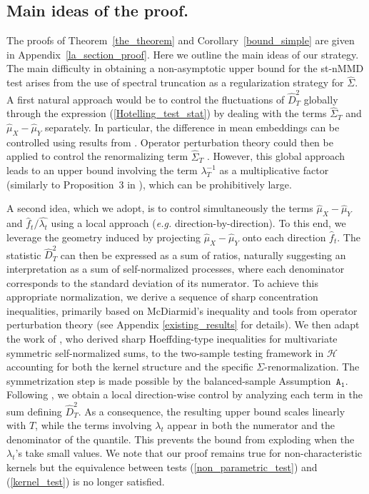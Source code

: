 \documentclass[twoside,11pt]{article}
\newcommand{\Hk}{\mathcal{H}}
\newcommand{\A}[1]{$\mathtt{A_#1}$}
\begin{document}
\subsection{Main ideas of the proof.}
The proofs of Theorem~\ref{the_theorem} and Corollary~\ref{bound_simple} are given in Appendix~\ref{la_section_proof}. Here we outline the main ideas of our strategy. The main difficulty in obtaining a non-asymptotic upper bound for the st-nMMD test arises from the use of spectral truncation as a regularization strategy for $\widehat{\Sigma}$. A first natural approach would be to control the fluctuations of $\widehat{D}^2_T$ globally through the expression (\ref{Hotelling_test_stat}) by dealing with the terms $\widehat{\Sigma}_T$ and $\widehat{\mu}_X-\widehat{\mu}_Y$ separately. 
In particular, the difference in mean embeddings can be controlled using results from \cite{gretton2012kernel}. Operator perturbation theory could then be applied to control the renormalizing term $\widehat{\Sigma}_T$ \citep{koltchinskii2000random,blanchard2007statistical,zwald2005convergence}. However, this global approach leads to an upper bound involving the term $\lambda_T^{-1}$ as a multiplicative factor (similarly to Proposition~3 in \cite{ozier2024extending}), which can be prohibitively large.

A second idea, which we adopt, is to control simultaneously the terms $\widehat{\mu}_X-\widehat{\mu}_Y$ and $\widehat{f}_t / \widehat{\lambda_t}$ using a local approach (\textit{e.g.} direction-by-direction). To this end, we  leverage the geometry induced by projecting $\widehat{\mu}_X - \widehat{\mu}_Y$ onto each direction $\widehat{f}_t$. 
The statistic $\widehat{D}^2_T$ can then be expressed as a sum of ratios, naturally suggesting an interpretation as a sum of self-normalized processes, where each denominator corresponds to the standard deviation of its numerator.
To achieve this appropriate normalization, we derive a sequence of sharp concentration inequalities, primarily based on McDiarmid's inequality and tools from operator perturbation theory (see Appendix \ref{existing_results} for details). We then adapt the work of \cite{bertail2008exponential}, who derived sharp Hoeffding-type inequalities for multivariate symmetric self-normalized sums, to the two-sample testing framework in $\Hk$ accounting for both the kernel structure and the specific $\Sigma$-renormalization. 
The symmetrization step is made possible by the balanced-sample Assumption~\A{1}. Following \cite{bertail2008exponential}, we obtain a local direction-wise control by analyzing each term in the sum defining $\widehat{D}_T^2$. As a consequence, the resulting upper bound scales linearly with $T$, while the terms involving $\lambda_t$ appear in both the numerator and the denominator of the quantile. This prevents the bound from exploding when the $\lambda_t$'s take small values. We note that our proof remains true for non-characteristic kernels but the equivalence between tests (\ref{non_parametric_test}) and (\ref{kernel_test}) is no longer satisfied.
\end{document}
